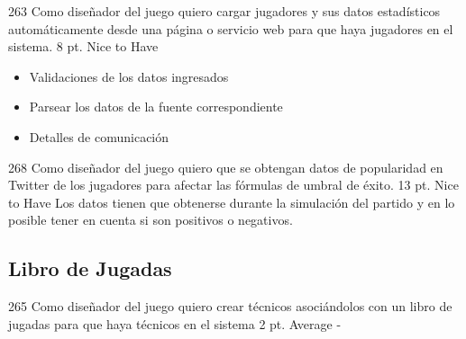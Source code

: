 \vspace{1cm}

\simplestory
{263}
{Como diseñador del juego quiero cargar jugadores y sus datos estadísticos automáticamente desde una página o servicio web para que haya jugadores en el sistema.}
{8 pt.}
{Nice to Have}
{\begin{itemize}
\item Validaciones de los datos ingresados
\item Parsear los datos de la fuente correspondiente
\item Detalles de comunicación
\end{itemize}}

\vspace{1cm}

\simplestory
{268}
{Como diseñador del juego quiero que se obtengan datos de popularidad en Twitter de los jugadores para afectar las fórmulas de umbral de éxito.}
{13 pt.}
{Nice to Have}
{Los datos tienen que obtenerse durante la simulación del partido y en lo posible tener en cuenta si son positivos o negativos.}

\vspace{1cm}

\subsection{Libro de Jugadas}
\simplestory
{265}
{Como diseñador del juego quiero crear técnicos asociándolos con un libro de jugadas para que haya técnicos en el sistema}
{2 pt.}
{Average}
{-}

\vspace{1cm}